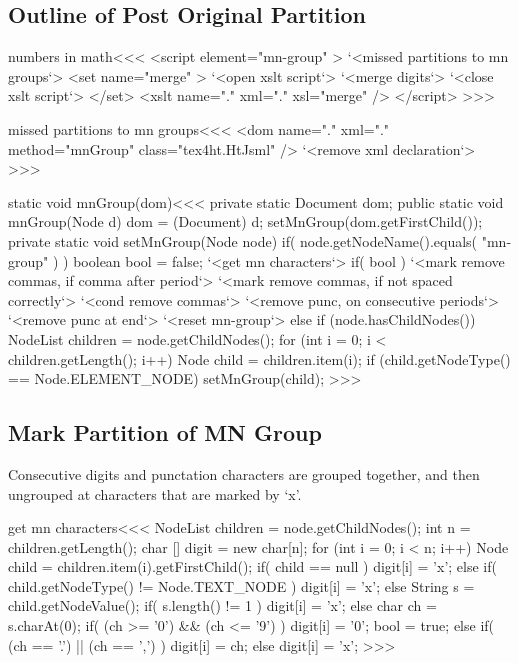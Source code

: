 \documentclass{article}
\begin{document}
\subsection{Outline of Post Original Partition}


\<numbers in math\><<<
<script element="mn-group" >
   `<missed partitions to mn groups`>
   <set name="merge" >
      `<open xslt script`>
      `<merge digits`>
      `<close xslt script`>
   </set>
   <xslt name="." xml="." xsl="merge" />
</script> 
>>>



\<missed partitions to mn groups\><<<
<dom name="." xml="." method="mnGroup" class="tex4ht.HtJsml" />
`<remove xml declaration`>
>>>


\<static void mnGroup(dom)\><<<
private static Document dom;
public static void mnGroup(Node d) {
  dom = (Document) d;
  setMnGroup(dom.getFirstChild());
}
private static void setMnGroup(Node node) {
  if( node.getNodeName().equals( "mn-group" ) ){
         boolean bool = false;
    `<get mn characters`>
    if( bool ){
      `<mark remove commas, if comma after period`>
      `<mark remove commas, if not spaced correctly`>
      `<cond remove commas`>
      `<remove punc, on consecutive periods`>
      `<remove punc at end`>
    }
    `<reset mn-group`>
  } else if (node.hasChildNodes()) {
     NodeList children = node.getChildNodes();
     for (int i = 0; i < children.getLength(); i++) {
        Node child = children.item(i);
        if (child.getNodeType() == Node.ELEMENT_NODE) {
           setMnGroup(child);
} }  }  }
>>>

\subsection{Mark Partition of MN Group}

Consecutive digits and punctation characters are grouped together, and
then ungrouped at characters that are marked by `x'.   


\<get mn characters\><<<
NodeList children = node.getChildNodes();
int n = children.getLength();
char [] digit = new char[n];
for (int i = 0; i < n; i++) {
  Node child = children.item(i).getFirstChild();
  if( child == null ){ 
     digit[i] = 'x';
  } else if( child.getNodeType() != Node.TEXT_NODE ){
     digit[i] = 'x';
  } else {
     String s = child.getNodeValue();
     if( s.length() != 1 ){ 
       digit[i] = 'x';
     } else {
       char ch = s.charAt(0);
       if(      (ch >= '0') && (ch <= '9') ){
          digit[i] = '0'; bool = true;
       } else if( (ch == '.') || (ch == ',') ){ digit[i] = ch; }
       else                                 { digit[i] = 'x';}
} }  }
>>>
\end{document}
